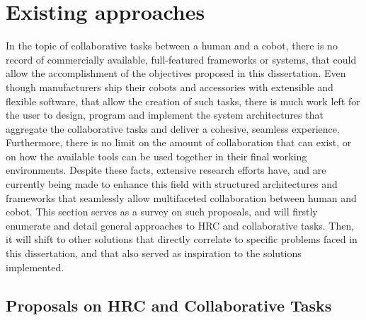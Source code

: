 \section{Existing approaches}


\par In the topic of collaborative tasks between a human and a cobot, there is no record of  commercially available, full-featured frameworks or systems, that could allow the accomplishment of the objectives proposed in this dissertation. Even though manufacturers ship their cobots and accessories with extensible and flexible software, that allow the creation of such tasks, there is much work left for the user to design, program and implement the system architectures that aggregate the collaborative tasks and deliver a cohesive, seamless experience. Furthermore, there is no limit on the amount of collaboration that can exist, or on how the available tools can be used together in their final working environments.
Despite these facts, extensive research efforts have, and are currently being made \cite{paper.review.1, paper.review.2} to enhance this field with structured architectures and frameworks that seamlessly allow multifaceted collaboration between human and cobot. This section serves as a survey on such proposals, and will firstly enumerate and detail general approaches to HRC and collaborative tasks. Then, it will shift to other solutions that directly correlate to specific problems faced in this dissertation, and that also served as inspiration to the solutions implemented. 

\subsection{Proposals on HRC and Collaborative Tasks}

